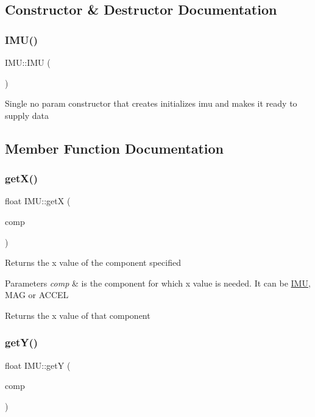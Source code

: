 \subsection{Constructor \& Destructor Documentation}
\mbox{\label{class_i_m_u_a5d36c5fa0688efe1a013679dbdcef4cc}} 
\subsubsection{\texorpdfstring{I\+M\+U()}{IMU()}}
{\footnotesize\ttfamily I\+M\+U\+::\+I\+MU (\begin{DoxyParamCaption}{ }\end{DoxyParamCaption})}

Single no param constructor that creates initializes imu and makes it ready to supply data 

\subsection{Member Function Documentation}
\mbox{\label{class_i_m_u_a949d2a569dcf4b6d8e3ec31b3fb269cb}} 
\subsubsection{\texorpdfstring{get\+X()}{getX()}}
{\footnotesize\ttfamily float I\+M\+U\+::getX (\begin{DoxyParamCaption}\item[{imu\+\_\+comp}]{comp }\end{DoxyParamCaption})}

Returns the x value of the component specified 
\begin{DoxyParams}{Parameters}
{\em comp} & is the component for which x value is needed. It can be \hyperlink{class_i_m_u}{I\+MU}, M\+AG or A\+C\+C\+EL \\
\hline
\end{DoxyParams}
\begin{DoxyReturn}{Returns}
the x value of that component 
\end{DoxyReturn}
\mbox{\label{class_i_m_u_af5a2bba6153657625fae0fdc8a228a40}} 
\subsubsection{\texorpdfstring{get\+Y()}{getY()}}
{\footnotesize\ttfamily float I\+M\+U\+::getY (\begin{DoxyParamCaption}\item[{imu\+\_\+comp}]{comp }\end{DoxyParamCaption})}

